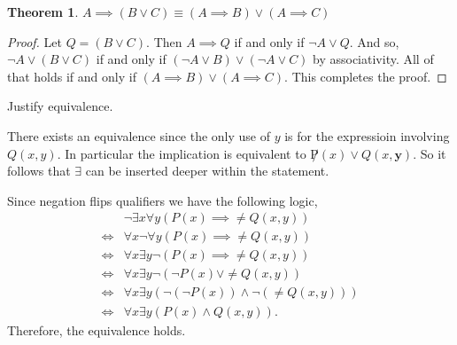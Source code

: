 \documentclass[letter]{article}
\newtheorem{theorem}{Theorem}
\newenvironment{menumerate}{%
  \edef\backupindent{\the\parindent}%
  \enumerate%
  \setlength{\parindent}{\backupindent}%
}{\endenumerate}
\begin{document}
\begin{menumerate}
\begin{menumerate}
        \item
        \begin{theorem}
            $A \implies (B \vee C) \equiv (A \implies B) \vee (A \implies C)$ 
        \end{theorem}
        \begin{proof}
         Let $Q = (B \vee C).$ Then $A \implies Q$ if and only if
            $\neg A \vee Q.$ And so, $\neg A \vee (B \vee  C)$
            if and only if $(\neg A \vee  B) \vee (\neg A \vee  C)$ by associativity. 
            All of that holds if and only if $(A \implies B) \vee (A \implies C).$
            This completes the proof.
        \end{proof}
    \end{menumerate}
    \item Justify equivalence.
    \begin{menumerate}
        \item There exists an equivalence since the only use of $y$ is for the expressioin
        involving $Q(x,y).$ In particular the implication is equivalent to $\not P(x) \vee Q(x,\pmb{y}).$ 
        So it follows that $\exists$ can be inserted deeper within the statement.
        \item Since negation flips qualifiers we have the following logic,
        \begin{equation}
          \begin{aligned}
            &\neg \exists x \forall y (P(x) \implies \neq Q(x,y)) \\
            \iff&  \forall x \neg \forall y (P(x) \implies \neq Q(x,y)) \\
            \iff&  \forall x \exists y \neg (P(x) \implies \neq Q(x,y)) \\
            \iff&  \forall x \exists y  \neg(\neg P(x) \vee \neq Q(x,y)) \\
            \iff&  \forall x \exists y  (\neg(\neg P(x)) \wedge \neg(\neq Q(x,y))) \\
            \iff&  \forall x \exists y  ( P(x) \wedge  Q(x,y)).
          \end{aligned}  
        \end{equation}  
        Therefore, the equivalence holds.


\end{menumerate}
\end{menumerate}
\end{document}
